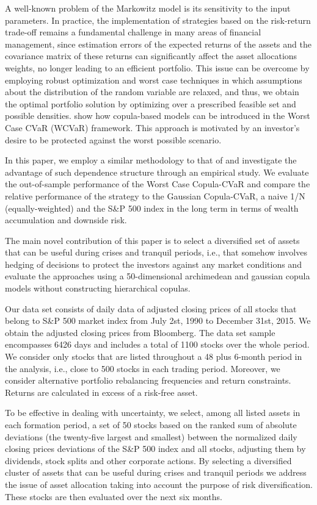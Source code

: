 \documentclass[a4paper,12pt]{report}
\begin{document}
\begin{refsection}
A well-known problem of the Markowitz model is its sensitivity to the input parameters. In practice, the implementation of strategies based on the risk-return trade-off remains a fundamental challenge in many areas of financial management, since estimation errors of the expected returns of the assets and the covariance matrix of these returns can significantly affect the asset allocations weights, no longer leading to an efficient portfolio. This issue can be overcome by employing robust optimization and
worst case techniques \citet*{zhu2009worst} in which assumptions about the
distribution of the random variable are relaxed, and thus, we obtain the
optimal portfolio solution by optimizing over a prescribed feasible set and
possible densities. \citet*{kakouris14} show how copula-based models can be
introduced in the Worst Case CVaR (WCVaR) framework. This approach is
motivated by an investor's desire to be protected against the worst possible
scenario.

In this paper, we employ a similar methodology to that of \citet*{kakouris14}
and investigate the advantage of such dependence structure through an
empirical study. We evaluate the out-of-sample performance of the Worst Case Copula-CVaR and compare the relative performance of the strategy to the Gaussian Copula-CVaR, a naive 1/N (equally-weighted) and the S\&P 500
index in the long term in terms of wealth accumulation and downside risk.

The main novel contribution of this paper is to select a diversified set of assets that can be useful during crises and tranquil periods, i.e., that somehow involves hedging of decisions to protect the investors against any market conditions and evaluate the approaches using a 50-dimensional archimedean and gaussian copula models without constructing hierarchical copulas.  

Our data set consists of daily data of adjusted closing prices of all
stocks that belong to S\&P 500 market index from July 2st, 1990 to December
31st, 2015. We obtain the adjusted closing prices from Bloomberg. The data
set sample encompasses 6426 days and includes a total of 1100 stocks over
the whole period. We consider only stocks that are listed throughout a 48
plus 6-month period in the analysis, i.e., close to 500 stocks in each
trading period. Moreover, we consider alternative portfolio rebalancing
frequencies and return constraints. Returns are calculated in excess of a risk-free asset.

To be effective in
dealing with uncertainty, we select, among all listed assets in each
formation period, a set of 50 stocks based on the ranked sum of absolute
deviations (the twenty-five largest and smallest) between the normalized
daily closing prices deviations of the S\&P 500 index
and all stocks, adjusting them by dividends, stock splits and other
corporate actions. By selecting a diversified cluster of assets that can be
useful during crises and tranquil periods we address the issue of asset
allocation taking into account the purpose of risk diversification. These
stocks are then evaluated over the next six months.


\end{refsection}
\end{document}
